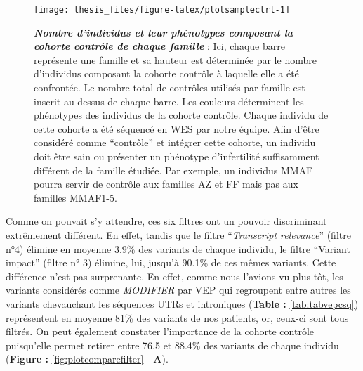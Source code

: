 \documentclass[12pt,a4paper,twoside]{ugathesis}
\theoremstyle{definition}
\theoremstyle{definition}
\theoremstyle{definition}
\theoremstyle{remark}
\begin{document}
\begin{figure}

{\centering \texttt{[image: thesis\_files/figure-latex/plotsamplectrl-1]} 

}

\caption[Nombre d'individus et leur phénotypes composant la cohorte contrôle de chaque famille]{\textbf{\emph{Nombre d'individus et leur phénotypes
composant la cohorte contrôle de chaque famille}} : Ici, chaque barre
représente une famille et sa hauteur est déterminée par le nombre
d'individus composant la cohorte contrôle à laquelle elle a été
confrontée. Le nombre total de contrôles utilisés par famille est
inscrit au-dessus de chaque barre. Les couleurs déterminent les
phénotypes des individus de la cohorte contrôle. Chaque individu de
cette cohorte a été séquencé en WES par notre équipe. Afin d'être
considéré comme ``contrôle'' et intégrer cette cohorte, un individu doit
être sain ou présenter un phénotype d'infertilité suffisamment différent
de la famille étudiée. Par exemple, un individus MMAF pourra servir de
contrôle aux familles AZ et FF mais pas aux familles MMAF1-5.}\label{fig:plotsamplectrl}
\end{figure}














\newpage

Comme on pouvait s'y attendre, ces six filtres ont un pouvoir
discriminant extrêmement différent. En effet, tandis que le filtre
``\emph{Transcript relevance}'' (filtre n°4) élimine en moyenne 3.9\%
des variants de chaque individu, le filtre ``Variant impact'' (filtre n°
3) élimine, lui, jusqu'à 90.1\% de ces mêmes variants. Cette différence
n'est pas surprenante. En effet, comme nous l'avions vu plus tôt, les
variants considérés comme \emph{MODIFIER} par VEP qui regroupent entre
autres les variants chevauchant les séquences UTRs et introniques
(\textbf{Table :} \ref{tab:tabvepcsq}) représentent en moyenne 81\% des
variants de nos patients, or, ceux-ci sont tous filtrés. On peut
également constater l'importance de la cohorte contrôle puisqu'elle
permet retirer entre 76.5 et 88.4\% des variants de chaque individu
(\textbf{Figure :} \ref{fig:plotcomparefilter} - \textbf{A}).
\end{document}
